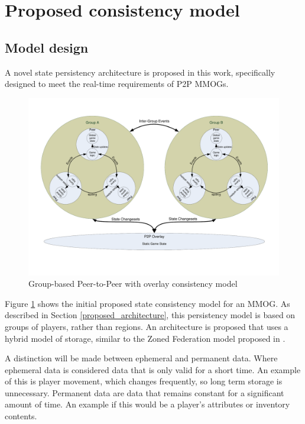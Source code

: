 \documentclass[journal,oneside,a4paper,onecolumn]{IEEEtran}
\begin{document}
\section{Proposed consistency model}
\label{proposed_consistency}

\subsection{Model design}
A novel state persistency architecture is proposed in this work, specifically designed to meet the real-time requirements of P2P MMOGs.

\begin{figure}[htbp]
 \centering
 \includegraphics[clip=true, viewport= 1cm 3cm 28.5cm 19cm, width=\columnwidth]{group_based_P2P_P2PO}
 \caption{Group-based Peer-to-Peer with overlay consistency model}
 \label{fig_p2p_group_o_cm}
\end{figure}
%
Figure \ref{fig_p2p_group_o_cm} shows the initial proposed state consistency model for an MMOG. As described in Section \ref{proposed_architecture}, this persistency model is based on groups of players, rather than regions. An architecture is proposed that uses a hybrid model of storage, similar to the Zoned Federation model proposed in \cite{zoned_federation}.

A distinction will be made between ephemeral and permanent data. Where ephemeral data is considered data that is only valid for a short time. An example of this is player movement, which changes frequently, so long term storage is unnecessary. Permanent data are data that remains constant for a significant amount of time. An example if this would be a player's attributes or inventory contents.
\end{document}
